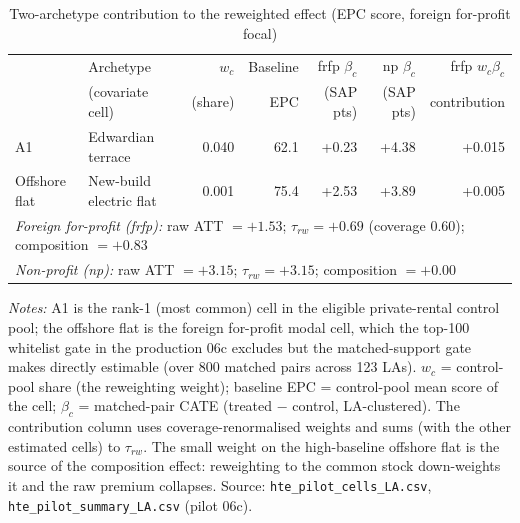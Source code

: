 \begin{table}[htbp]
\centering
\caption{Two-archetype contribution to the reweighted effect (EPC score, foreign for-profit focal)}
\label{tab:hte_pilot_contribution}
\small
\begin{tabular}{llrrrrr}
\toprule
 & Archetype & $w_c$ & Baseline & frfp $\beta_c$ & np $\beta_c$ & frfp $w_c\beta_c$ \\
 & (covariate cell) & (share) & EPC & (SAP pts) & (SAP pts) & contribution \\
\midrule
A1 & Edwardian terrace & 0.040 & 62.1 & +0.23 & +4.38 & +0.015 \\
Offshore flat & New-build electric flat & 0.001 & 75.4 & +2.53 & +3.89 & +0.005 \\
\midrule
\multicolumn{7}{l}{\textit{Foreign for-profit (frfp):} raw ATT $= +1.53$; $\tau_{rw} = +0.69$ (coverage 0.60); composition $= +0.83$} \\
\multicolumn{7}{l}{\textit{Non-profit (np):} raw ATT $= +3.15$; $\tau_{rw} = +3.15$; composition $= +0.00$} \\
\bottomrule
\end{tabular}
\begin{minipage}{0.95\textwidth}
\vspace{4pt}
\footnotesize
\textit{Notes:} A1 is the rank-1 (most common) cell in the eligible private-rental
control pool; the offshore flat is the foreign for-profit modal cell, which the
top-100 whitelist gate in the production 06c excludes but the matched-support gate
makes directly estimable (over 800 matched pairs across 123 LAs). $w_c$ = control-pool share
(the reweighting weight); baseline EPC = control-pool mean score of the cell; $\beta_c$
= matched-pair CATE (treated $-$ control, LA-clustered). The contribution column uses
coverage-renormalised weights and sums (with the other estimated cells) to $\tau_{rw}$.
The small weight on the high-baseline offshore flat is the source of the composition
effect: reweighting to the common stock down-weights it and the raw premium collapses.
Source: \texttt{hte\_pilot\_cells\_LA.csv}, \texttt{hte\_pilot\_summary\_LA.csv} (pilot 06c).
\end{minipage}
\end{table}
